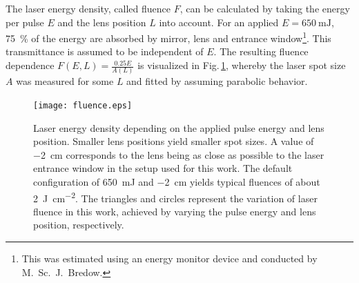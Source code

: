 The laser energy density, called fluence $F$, can be calculated by taking the energy per pulse $E$ and the lens position $L$ into account.
For an applied $E=\qty{650}{\milli\joule}$, \qty{75}{\percent} of the energy are absorbed by mirror, lens and entrance window\footnote{
    This was estimated using an energy monitor device and conducted by M.\ Sc.\ J.\ Bredow.}.
This transmittance is assumed to be independent of $E$.
The resulting fluence dependence $F(E,L)=\frac{0.25E}{A(L)}$ is visualized in Fig.\,\ref{Fig:Methods_fluence}, whereby the laser spot size $A$ was measured for some $L$ and fitted by assuming parabolic behavior.

\begin{figure}
    \centering
    \texttt{[image: fluence.eps]}
    \caption{Laser energy density depending on the applied pulse energy and lens position. Smaller lens positions yield smaller spot sizes. A value of \qty{-2}{\cm} corresponds to the lens being as close as possible to the laser entrance window in the setup used for this work.
    The default configuration of \qty{650}{\milli\joule} and \qty{-2}{cm} yields typical fluences of about \qty{2}{\J\per\square\cm}.
    The triangles and circles represent the variation of laser fluence in this work, achieved by varying the pulse energy and lens position, respectively.}
    \label{Fig:Methods_fluence}
\end{figure}

